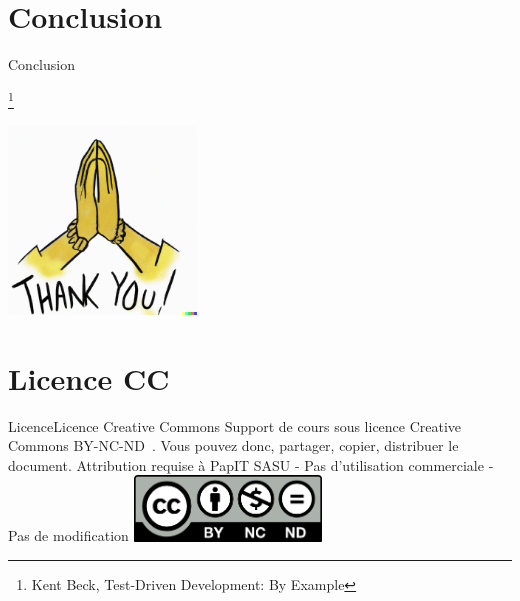 \documentclass{beamer}
\begin{document}
    \section{Conclusion}\label{sec:conclusion}

    \begin{frame}{Conclusion}
        \centering
        \begin{large}
            \footnote{Kent Beck, Test-Driven Development: By Example}
        \end{large}
        \bigbreak
        \includegraphics[width=5cm]{image/thank-you}
    \end{frame}


    \section{Licence CC}\label{sec:licence}

    \begin{frame}{Licence}{Licence Creative Commons}
        Support de cours sous licence Creative Commons BY-NC-ND~.
        \bigbreak
        Vous pouvez donc, partager, copier, distribuer le document.
        \bigbreak
        Attribution requise à PapIT SASU - Pas d’utilisation commerciale - Pas de modification
        \bigbreak
        \centering
        \includegraphics[width=5cm]{image/by-nc-nd-logo}
    \end{frame}
\end{document}
